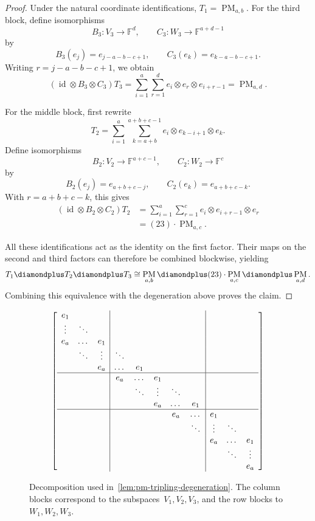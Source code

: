 \documentclass[11pt,letterpaper]{article}
\numberwithin{equation}{section}
\newcommand{\FF}{\mathbb{F}}
\DeclareMathOperator{\PM}{PM}
\begin{document}
\begin{proof}
Under the natural coordinate identifications,
$T_1=\PM_{a,b}$.
For the third block, define isomorphisms
\[
B_3\colon V_3\longrightarrow\FF^d,
\qquad
C_3\colon W_3\longrightarrow\FF^{a+d-1}
\]
by
\[
B_3(e_j)=e_{j-a-b-c+1},
\qquad
C_3(e_k)=e_{k-a-b-c+1}.
\]
Writing $r=j-a-b-c+1$, we obtain
\[
(\operatorname{id}\otimes B_3\otimes C_3)T_3
=
\sum_{i=1}^{a}\sum_{r=1}^{d}
e_i\otimes e_r\otimes e_{i+r-1}
=\PM_{a,d}.
\]

For the middle block, first rewrite
\[
T_2
=
\sum_{i=1}^{a}\sum_{k=a+b}^{a+b+c-1}
e_i\otimes e_{k-i+1}\otimes e_k.
\]
Define isomorphisms
\[
B_2\colon V_2\longrightarrow\FF^{a+c-1},
\qquad
C_2\colon W_2\longrightarrow\FF^c
\]
by
\[
B_2(e_j)=e_{a+b+c-j},
\qquad
C_2(e_k)=e_{a+b+c-k}.
\]
With $r=a+b+c-k$, this gives
\begin{align*}
(\operatorname{id}\otimes B_2\otimes C_2)T_2
&=
\sum_{i=1}^{a}\sum_{r=1}^{c}
e_i\otimes e_{i+r-1}\otimes e_r\\
&=(23)\cdot\PM_{a,c}.
\end{align*}

All these identifications act as the identity on the first
factor. Their maps on the second and third factors can therefore
be combined blockwise, yielding
\[
T_1\diamondplus T_2\diamondplus T_3
\cong
\PM_{a,b}\diamondplus
(23)\cdot\PM_{a,c}\diamondplus
\PM_{a,d}.
\]
Combining this equivalence with the degeneration above proves
the claim.
\end{proof}

\begin{figure}[h!]
\[\left[
\begin{array}{ccc|ccccc|ccc}
e_1 & & & & & & & & & &\\
\vdots & \ddots & & & & & & & & &\\
e_a & \dots & e_1 & & & & & & & &\\
 & \ddots & \vdots & \ddots & & & & & & &\\
 & & e_a & \dots & e_1 & & & & & &\\
\hline
 & & & e_a & \dots & e_1 & & & & & \\
 & & & & \ddots & \vdots & \ddots & & & & \\
 & & & & & e_a & \dots & e_1 & & & \\
 \hline
 & & & & & & e_a & \dots & e_1 & & \\
 & & & & & & & \ddots & \vdots & \ddots & \\
 & & & & & & & & e_a & \dots & e_1 \\
 & & & & & & & & & \ddots & \vdots \\
 & & & & & & & & & & e_a \\
\end{array}
\right]\]
\caption{Decomposition used in~\cref{lem:pm-tripling-degeneration}.
The column blocks correspond to the subspaces~$V_1,V_2,V_3$, and the row blocks to $W_1,W_2,W_3$.}
\end{figure}
\end{document}

